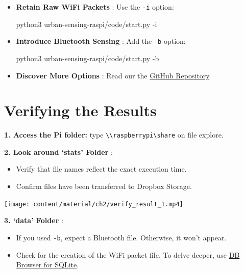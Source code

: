\documentclass[
  letterpaper,
]{scrbook}
\newenvironment{Shaded}{\begin{snugshade}}{\end{snugshade}}
\newcommand{\AttributeTok}[1]{\textcolor[rgb]{0.40,0.45,0.13}{#1}}
\newcommand{\ExtensionTok}[1]{\textcolor[rgb]{0.00,0.23,0.31}{#1}}
\newcommand{\NormalTok}[1]{\textcolor[rgb]{0.00,0.23,0.31}{#1}}
\providecommand{\tightlist}{%
  \setlength{\itemsep}{0pt}\setlength{\parskip}{0pt}}\usepackage{longtable,booktabs,array}
\begin{document}
\begin{itemize}
\item
  \textbf{Retain Raw WiFi Packets} : Use the \texttt{-i} option:

\begin{Shaded}
\begin{Highlighting}[]
\ExtensionTok{python3}\NormalTok{ urban{-}sensing{-}raspi/code/start.py }\AttributeTok{{-}i}
\end{Highlighting}
\end{Shaded}
\item
  \textbf{Introduce Bluetooth Sensing} : Add the \texttt{-b} option:

\begin{Shaded}
\begin{Highlighting}[]
\ExtensionTok{python3}\NormalTok{ urban{-}sensing{-}raspi/code/start.py }\AttributeTok{{-}b}
\end{Highlighting}
\end{Shaded}
\item
  \textbf{Discover More Options} : Read our the
  \href{https://github.com/urbanjuhyeon/urban-sensing-raspi}{GitHub
  Repository}.
\end{itemize}

\section{Verifying the Results}\label{verifying-the-results}

\textbf{1. Access the Pi folder:} type
\texttt{\textbackslash{}\textbackslash{}raspberrypi\textbackslash{}share}
on file explore.

\textbf{2. Look around `stats' Folder} :

\begin{itemize}
\tightlist
\item
  Verify that file names reflect the exact execution time.
\item
  Confirm files have been transferred to Dropbox Storage.
\end{itemize}

\texttt{[image: content/material/ch2/verify\_result\_1.mp4]}

\textbf{3. `data' Folder} :

\begin{itemize}
\tightlist
\item
  If you used \texttt{-b}, expect a Bluetooth file. Otherwise, it won't
  appear.
\item
  Check for the creation of the WiFi packet file. To delve deeper, use
  \href{https://sqlitebrowser.org/}{DB Browser for SQLite}.
\end{itemize}
\end{document}
